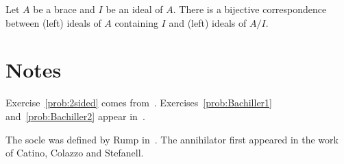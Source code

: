 \begin{prob}
\label{prob:correspondence}
Let $A$ be a brace and $I$ be an ideal of $A$. There is a bijective correspondence between (left) ideals 
of $A$ containing $I$ and (left) ideals of $A/I$. 
\end{prob}

\section*{Notes}

Exercise~\ref{prob:2sided} comes from~\cite{MR3177933}. 
Exercises~\ref{prob:Bachiller1} and~\ref{prob:Bachiller2} appear in~\cite{MR3835326}.

The socle was defined by Rump in~\cite{MR2278047}. The annihilator first appeared in the work~\cite{MR3917122}  
of Catino, Colazzo and Stefanell. 